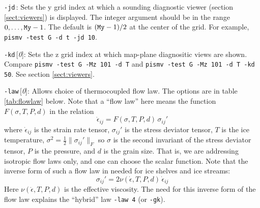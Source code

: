 \documentclass[11pt,final]{amsart}
\renewcommand{\t}[1]{\texttt{#1}}
\newcommand{\eps}{\epsilon}
\newcommand{\rawopt}[1]{\vspace{1mm}\noindent \Large\texttt{-#1}\normalsize}
\newcommand{\opt}[1]{\rawopt{#1}\,:\quad}
\newcommand{\optdef}[2]{\rawopt{#1}\,[\textsl{#2}]:\quad}
\begin{document}
\opt{jd}  Sets the y grid index at which a sounding diagnostic viewer (section \ref{sect:viewers}) is displayed.  The integer argument should be in the range $0,\dots,\text{\t{My}}-1$.  The default is $(\text{\t{My}}-1)/2$ at the center of the grid.  For example, \verb|pismv -test G -d t -jd 10|.

\optdef{kd}{0}  Sets the z grid index at which map-plane diagnositic views are shown.  Compare \verb|pismv -test G -Mz 101 -d T| and \verb|pismv -test G -Mz 101 -d T -kd 50|.  See section \ref{sect:viewers}.

\optdef{law}{0}  Allows choice of thermocoupled flow law.  The options are in table \ref{tab:flowlaw} below.  Note that a ``flow law'' here means the function $F(\sigma,T,P,d)$ in the relation
	$$\dot \eps_{ij} = F(\sigma,T,P,d)\, \sigma_{ij}'$$
where $\dot \eps_{ij}$ is the strain rate tensor, $\sigma_{ij}'$ is the stress deviator tensor, $T$ is the ice temperature, $\sigma^2 = \frac{1}{2} \|\sigma_{ij}'\|_F$ so $\sigma$ is the second invariant of the stress deviator tensor, $P$ is the pressure, and $d$ is the grain size.  That is, we are addressing isotropic flow laws only, and one can choose the scalar function.  Note that the inverse form of such a flow law in needed for ice shelves and ice streams:
	$$\sigma_{ij}' = 2 \nu(\dot\eps,T,P,d)\,\dot \eps_{ij} $$
Here $\nu(\dot \eps,T,P,d)$ is the effective viscosity.  The need for this inverse form of the flow law explains the ``hybrid'' law \verb|-law 4| (or \verb|-gk|).
\end{document}
